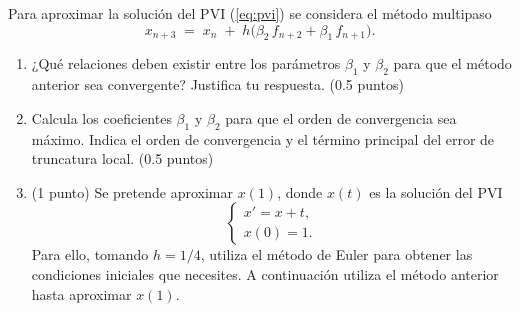 \documentclass[12pt]{article}
\begin{document}
    \begin{ejercicio}[2 puntos]
        Para aproximar la solución del PVI (\ref{eq:pvi}) se considera el método multipaso
        \[
        x_{n+3} \;=\; x_n \;+\; h\bigl(\beta_2\,f_{n+2} + \beta_1\,f_{n+1}\bigr).
        \]
        \begin{enumerate}
          \item ¿Qué relaciones deben existir entre los parámetros $\beta_1$ y $\beta_2$ para que el método anterior sea convergente? Justifica tu respuesta. (0.5 puntos)
          \item Calcula los coeficientes $\beta_1$ y $\beta_2$ para que el orden de convergencia sea máximo. Indica el orden de convergencia y el término principal del error de truncatura local. (0.5 puntos)
          \item (1 punto) Se pretende aproximar $x(1)$, donde $x(t)$ es la solución del PVI
          \[
            \begin{cases}
              x' = x + t,\\
              x(0)=1.
            \end{cases}
          \]
          Para ello, tomando $h=1/4$, utiliza el método de Euler para obtener las condiciones iniciales que necesites. A continuación utiliza el método anterior hasta aproximar $x(1)$.
        \end{enumerate}
    \end{ejercicio}

    \newpage

    \setcounter{ejercicio}{0}
\end{document}
